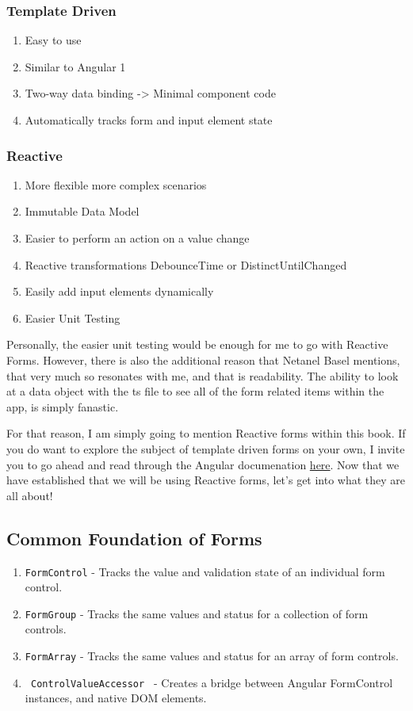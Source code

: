 \subsubsection{Template Driven}
\begin{enumerate}
  \item Easy to use
  \item Similar to Angular 1
  \item Two-way data binding -> Minimal component code
  \item Automatically tracks form and input element state
\end{enumerate}

\subsubsection{ Reactive }
\begin{enumerate}
  \item More flexible \textrightarrow{} more complex scenarios
  \item Immutable Data Model
  \item Easier to perform an action on a value change
  \item Reactive transformations \textrightarrow{} DebounceTime or DistinctUntilChanged
  \item Easily add input elements dynamically
  \item Easier Unit Testing
\end{enumerate}

Personally, the easier unit testing would be enough for me to go with 
Reactive Forms. However, there is also the additional reason that 
Netanel Basel mentions, that very much so resonates with me, and that 
is readability. The ability to look at a data object with the ts  file to see 
all of the form related items within the app, is simply fanastic. 

For that reason, I am simply going to mention Reactive forms within this book. 
If you do want to explore the subject of template driven forms on your own, I 
invite you to go ahead and read through the Angular documenation 
\href{https://angular.io/guide/forms-overview#setup-in-template-driven-forms}{here}. 
Now that we have established that we will be using Reactive forms, let's get into 
what they are all about!

\subsection{ Common Foundation of Forms }
\begin{enumerate}
  \item \lstinline{FormControl} - Tracks the value and validation state of an 
  individual form control.
  \item \lstinline{FormGroup} - Tracks the same values and status for a 
  collection of form controls.
  \item \lstinline{FormArray} - Tracks the same values and status for an array
  of form controls. 
  \item \lstinline{ ControlValueAccessor } - Creates a bridge between Angular
  FormControl instances, and native DOM elements.
\end{enumerate}


